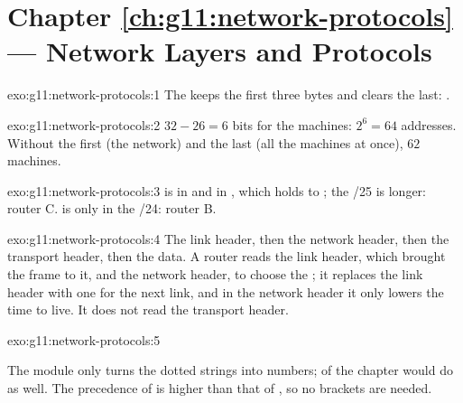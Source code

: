 \section*{Chapter \ref{ch:g11:network-protocols} --- Network Layers and Protocols}

\begin{solution}{exo:g11:network-protocols:1}
The   keeps the first three bytes and clears the last: .
\end{solution}

\begin{solution}{exo:g11:network-protocols:2}
$32 - 26 = 6$ bits for the machines: $2^6 = 64$ addresses. Without the first (the network) and the last (all the
machines at once), $62$ machines.
\end{solution}

\begin{solution}{exo:g11:network-protocols:3}
 is in  and in , which holds  to
; the /25 is longer: router C.  is only in the /24: router B.
\end{solution}

\begin{solution}{exo:g11:network-protocols:4}
The link header, then the network header, then the transport header, then the data. A router reads the link header,
which brought the frame to it, and the network header, to choose the ; it replaces the link header with one
for the next link, and in the network header it only lowers the time to live. It does not read the transport header.
\end{solution}

\begin{solution}{exo:g11:network-protocols:5}
\smallskip\noindent\hspace*{2em}

\noindent\hspace*{4em}

\noindent\hspace*{4em}

\noindent\hspace*{4em}

\noindent\hspace*{4em}

\smallskip\noindent The module only turns the dotted strings into numbers;  of the chapter would do as
well. The precedence of \code{&} is higher than that of \code{==}, so no brackets are needed.
\end{solution}

